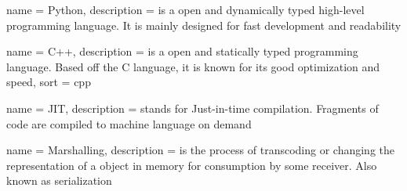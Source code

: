 {
	name		= {Python},
	description = {is a open and dynamically typed high-level programming language. It is mainly designed for fast development and readability}
}

{
	name		= {C++},
	description = {is a open and statically typed programming language. Based off the C language, it is known for its good optimization and speed},
	sort		= {cpp}
}

{
	name		= {JIT},
	description = {stands for Just-in-time compilation. Fragments of code are compiled to machine language on demand}
}

{
	name		= {Marshalling},
	description = {is the process of transcoding or changing the representation of a object in memory for consumption by some receiver. Also known as serialization}
}
